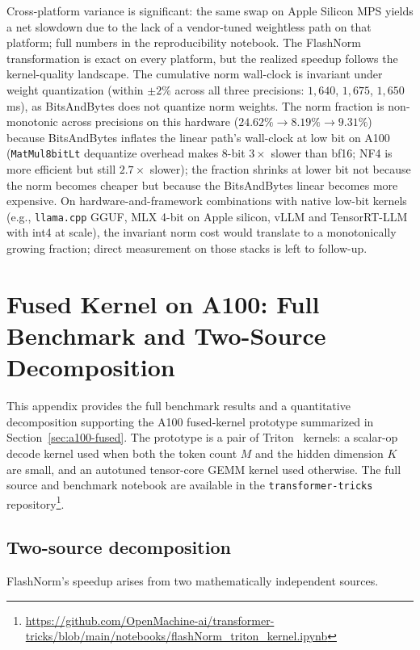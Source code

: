 \documentclass{article}
\begin{document}
Cross-platform variance is significant: the same swap on Apple Silicon MPS yields a net slowdown due to the lack of a vendor-tuned weightless path on that platform; full numbers in the reproducibility notebook. The FlashNorm transformation is exact on every platform, but the realized speedup follows the kernel-quality landscape. The cumulative norm wall-clock is invariant under weight quantization (within $\pm 2\%$ across all three precisions: $1{,}640$, $1{,}675$, $1{,}650$\,ms), as BitsAndBytes does not quantize norm weights. The norm fraction is non-monotonic across precisions on this hardware ($24.62\% \to 8.19\% \to 9.31\%$) because BitsAndBytes inflates the linear path's wall-clock at low bit on A100 (\texttt{MatMul8bitLt} dequantize overhead makes 8-bit $3\times$ slower than bf16; NF4 is more efficient but still $2.7\times$ slower); the fraction shrinks at lower bit not because the norm becomes cheaper but because the BitsAndBytes linear becomes more expensive. On hardware-and-framework combinations with native low-bit kernels (e.g., \texttt{llama.cpp} GGUF, MLX 4-bit on Apple silicon, vLLM and TensorRT-LLM with int4 at scale), the invariant norm cost would translate to a monotonically growing fraction; direct measurement on those stacks is left to follow-up.

\section{Fused Kernel on A100: Full Benchmark and Two-Source Decomposition}\label{app:a100}

This appendix provides the full benchmark results and a quantitative decomposition supporting the A100 fused-kernel prototype summarized in Section~\ref{sec:a100-fused}. The prototype is a pair of Triton~\citep{triton} kernels: a scalar-op decode kernel used when both the token count $M$ and the hidden dimension $K$ are small, and an autotuned tensor-core GEMM kernel used otherwise.
The full source and benchmark notebook are available in the \texttt{transformer-tricks} repository\footnote{\url{https://github.com/OpenMachine-ai/transformer-tricks/blob/main/notebooks/flashNorm\_triton\_kernel.ipynb}}.

\subsection{Two-source decomposition}

FlashNorm's speedup arises from two mathematically independent sources.
\end{document}
